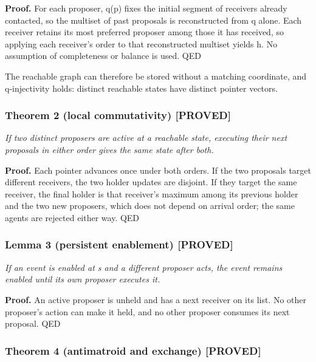 \documentclass[
  11pt,
]{article}
\begin{document}
\textbf{Proof.} For each proposer, q(p) fixes the initial segment of
receivers already contacted, so the multiset of past proposals is
reconstructed from q alone. Each receiver retains its most preferred
proposer among those it has received, so applying each receiver's order
to that reconstructed multiset yields h. No assumption of completeness
or balance is used. QED

The reachable graph can therefore be stored without a matching
coordinate, and q-injectivity holds: distinct reachable states have
distinct pointer vectors.

\hypertarget{theorem-2-local-commutativity-proved}{%
\subsubsection{Theorem 2 (local commutativity)
{[}PROVED{]}}\label{theorem-2-local-commutativity-proved}}

\emph{If two distinct proposers are active at a reachable state,
executing their next proposals in either order gives the same state
after both.}

\textbf{Proof.} Each pointer advances once under both orders. If the two
proposals target different receivers, the two holder updates are
disjoint. If they target the same receiver, the final holder is that
receiver's maximum among its previous holder and the two new proposers,
which does not depend on arrival order; the same agents are rejected
either way. QED

\hypertarget{lemma-3-persistent-enablement-proved}{%
\subsubsection{Lemma 3 (persistent enablement)
{[}PROVED{]}}\label{lemma-3-persistent-enablement-proved}}

\emph{If an event is enabled at s and a different proposer acts, the
event remains enabled until its own proposer executes it.}

\textbf{Proof.} An active proposer is unheld and has a next receiver on
its list. No other proposer's action can make it held, and no other
proposer consumes its next proposal. QED

\hypertarget{theorem-4-antimatroid-and-exchange-proved}{%
\subsubsection{Theorem 4 (antimatroid and exchange)
{[}PROVED{]}}\label{theorem-4-antimatroid-and-exchange-proved}}
\end{document}
